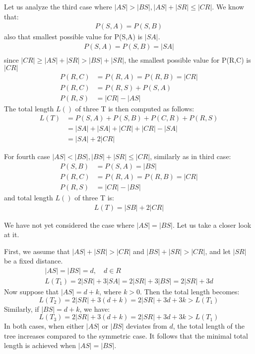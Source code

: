 \documentclass[12pt]{article}
\newcommand{\Prize}[2]{P(#1,#2)}
\begin{document}
	Let us analyze the third case where \( |AS| > |BS|, |AS|+|SR| \leq |CR| \).
	We know that:
	\begin{align*}
		\Prize{S}{A} = \Prize{S}{B}
	\end{align*}
	also that smallest possible value for \Prize{S}{A} is \(|SA|\).
	\begin{align*}	
		\Prize{S}{A} = \Prize{S}{B} = |SA| \\
	\end{align*}
	since \(|CR| \geq |AS|+|SR| > |BS|+|SR| \), the smallest possible value for \Prize{R}{C} is \(|CR|\)
	\begin{align*}
	 	\Prize{R}{C} &= \Prize{R}{A} = \Prize{R}{B} = |CR| \\
	 	\Prize{R}{C} &= \Prize{R}{S} + \Prize{S}{A} \\
	 	\Prize{R}{S} &= |CR| - |AS|
	\end{align*}
	The total length \( L() \) of three T is then computed as follows:
	\begin{align*}	
		L(T) &= \Prize{S}{A} + \Prize{S}{B} + \Prize{C}{R} + \Prize{R}{S} \\
		&= |SA| + |SA| + |CR| + |CR| - |SA| \\
		&= |SA| + 2 |CR|
	\end{align*}

	For fourth case \( |AS| < |BS|, |BS|+|SR| \leq |CR| \), similarly as in third case:
	\begin{align*}
		\Prize{S}{B} &= \Prize{S}{A} = |BS| \\
		\Prize{R}{C} &= \Prize{R}{A} = \Prize{R}{B} = |CR| \\
	 	\Prize{R}{S} &= |CR| - |BS|
	\end{align*}
	and total length \( L() \) of three T is:
	\begin{align*}	
		L(T) = |SB| + 2 |CR|
	\end{align*}
		 
		 
	We have not yet considered the case where \( |AS| = |BS| \). Let us take a closer look at it. 
	
	First, we assume that \( |AS| + |SR| > |CR| \) and \( |BS| + |SR| > |CR| \), and let \( |SR| \) be a fixed distance.
	\begin{align*}
		|AS| = |BS| = d, \quad d \in R \\
		L(T_1) = 2|SR| + 3|SA| = 2|SR| + 3|BS| = 2|SR| + 3d
	\end{align*}
	Now suppose that \( |AS| = d + k \), where \( k > 0 \). Then the total length becomes:
	\[
	L(T_2) = 2|SR| + 3(d + k) = 2|SR| + 3d + 3k > L(T_1)
	\]
	Similarly, if \( |BS| = d + k \), we have:
	\[
	L(T_3) = 2|SR| + 3(d + k) = 2|SR| + 3d + 3k > L(T_1)
	\]
	In both cases, when either \( |AS| \) or \( |BS| \) deviates from \( d \), the total length of the tree increases compared to the symmetric case. It follows that the minimal total length is achieved when \( |AS| = |BS| \).
	
\end{document}
